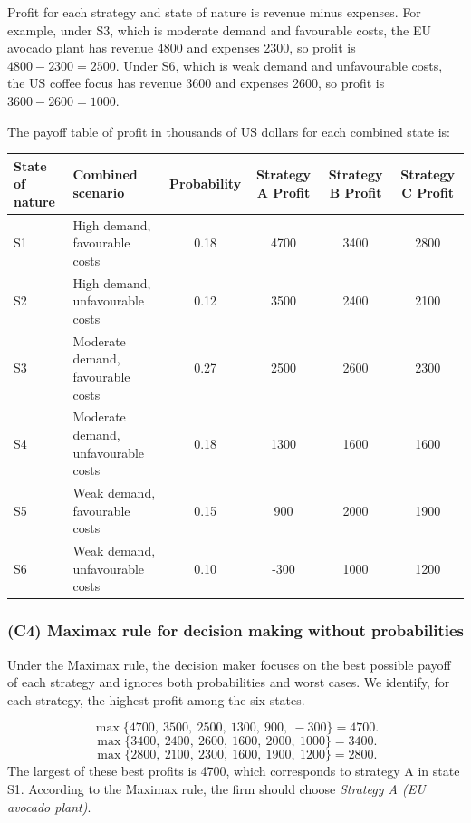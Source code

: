 \documentclass[11pt]{article}
\begin{document}
	\medskip
	Profit for each strategy and state of nature is revenue minus expenses. For example, under S3, which is moderate demand and favourable costs, the EU avocado plant has revenue 4800 and expenses 2300, so profit is \(4800-2300=2500\). Under S6, which is weak demand and unfavourable costs, the US coffee focus has revenue 3600 and expenses 2600, so profit is \(3600-2600=1000\).
	
	\medskip
	The payoff table of profit in thousands of US dollars for each combined state is:
	\begin{table}[h!]
		\centering
		\begin{tabularx}{\linewidth}{@{}lYcccc@{}}
			\toprule
			State of nature & Combined scenario & Probability & Strategy A Profit & Strategy B Profit & Strategy C Profit \\
			\midrule
			S1 & High demand, favourable costs   & 0.18 & 4700 & 3400 & 2800 \\
			S2 & High demand, unfavourable costs & 0.12 & 3500 & 2400 & 2100 \\
			S3 & Moderate demand, favourable costs   & 0.27 & 2500 & 2600 & 2300 \\
			S4 & Moderate demand, unfavourable costs & 0.18 & 1300 & 1600 & 1600 \\
			S5 & Weak demand, favourable costs   & 0.15 & 900  & 2000 & 1900 \\
			S6 & Weak demand, unfavourable costs & 0.10 & -300 & 1000 & 1200 \\
			\bottomrule
		\end{tabularx}
	\end{table}
	
	\subsubsection{(C4) Maximax rule for decision making without probabilities}\label{subsubsec:example2-c4}
	
	Under the Maximax rule, the decision maker focuses on the best possible payoff of each strategy and ignores both probabilities and worst cases. We identify, for each strategy, the highest profit among the six states.
	
	\[
	\max\{4700,\ 3500,\ 2500,\ 1300,\ 900,\ -300\}=4700.
	\]
	\[
	\max\{3400,\ 2400,\ 2600,\ 1600,\ 2000,\ 1000\}=3400.
	\]
	\[
	\max\{2800,\ 2100,\ 2300,\ 1600,\ 1900,\ 1200\}=2800.
	\]
	The largest of these best profits is 4700, which corresponds to strategy A in state S1. According to the Maximax rule, the firm should choose \emph{Strategy A (EU avocado plant)}.
	
\end{document}
